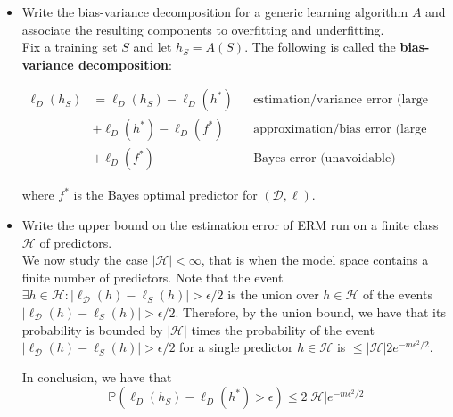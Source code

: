 \begin{itemize}
    \item Write the bias-variance decomposition for a generic learning algorithm $A$ and associate the resulting components to overfitting and underfitting.\\

       Fix a training set $S$ and let $h_S = A(S)$. The following is called the \textbf{bias-variance decomposition}:

    \begin{equation} 
            \begin{aligned}
                \ell_{D}(h_{S}) & = \ell_{D}(h_S) - \ell_{D}(h^{*}) && \text{estimation/variance error (large when overfitting)} \\ 
                                & + \ell_{D}(h^{*}) - \ell_{D}(f^{*}) && \text{approximation/bias error (large when underfitting)} \\
                                & + \ell_{D}(f^{*}) && \text{Bayes error (unavoidable)} 
            \end{aligned}
        \end{equation}

    where $f^*$ is the Bayes optimal predictor for $(\mathcal{D}, \ell)$.\\

    \item  Write the upper bound on the estimation error of ERM run on a finite class $\mathcal{H}$ of predictors.\\
        
        We now study the case $|\mathcal{H}| < \infty$, that is when the model space contains a finite number of predictors. 
        Note that the event $\exists h \in \mathcal{H} : |\ell_{\mathcal{D}}(h) - \ell_{S}(h)| > \epsilon / 2$ is the union over $h \in \mathcal{H}$ of the events $|\ell_{\mathcal{D}}(h) - \ell_{S}(h)| > \epsilon / 2$. 
        Therefore, by the union bound, we have that its probability is bounded by $|\mathcal{H}|$ times the probability of the event $|\ell_{\mathcal{D}}(h) - \ell_{S}(h)| > \epsilon / 2$ for a single predictor $h \in \mathcal{H}$ is $\leq |\mathcal{H}|2e^{-m\epsilon^2/2}$.

        In conclusion, we have that
        $$
            \mathbb{P}(\ell_{D}(h_S) - \ell_{D}(h^*) > \epsilon) \leq 2|\mathcal{H}|e^{-m\epsilon^2/2}
        $$



\end{itemize}

